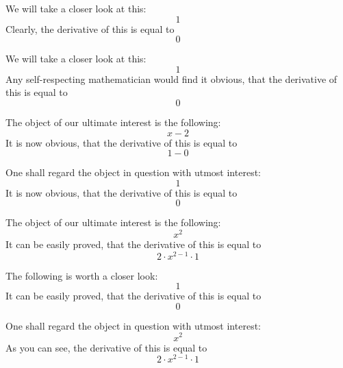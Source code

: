 \documentclass{article}
\begin{document}
We will take a closer look at this:
\begin{equation}
1 
\end{equation}
Clearly, the derivative of this is equal to
\begin{equation}
0 
\end{equation}

We will take a closer look at this:
\begin{equation}
1 
\end{equation}
Any self-respecting mathematician would find it obvious, that the derivative of this is equal to
\begin{equation}
0 
\end{equation}

The object of our ultimate interest is the following:
\begin{equation}
x - 2 
\end{equation}
It is now obvious, that the derivative of this is equal to
\begin{equation}
1 - 0 
\end{equation}

One shall regard the object in question with utmost interest:
\begin{equation}
1 
\end{equation}
It is now obvious, that the derivative of this is equal to
\begin{equation}
0 
\end{equation}

The object of our ultimate interest is the following:
\begin{equation}
x ^{2 } 
\end{equation}
It can be easily proved, that the derivative of this is equal to
\begin{equation}
2 \cdot x ^{2 - 1 } \cdot 1 
\end{equation}

The following is worth a closer look:
\begin{equation}
1 
\end{equation}
It can be easily proved, that the derivative of this is equal to
\begin{equation}
0 
\end{equation}

One shall regard the object in question with utmost interest:
\begin{equation}
x ^{2 } 
\end{equation}
As you can see, the derivative of this is equal to
\begin{equation}
2 \cdot x ^{2 - 1 } \cdot 1 
\end{equation}
\end{document}
